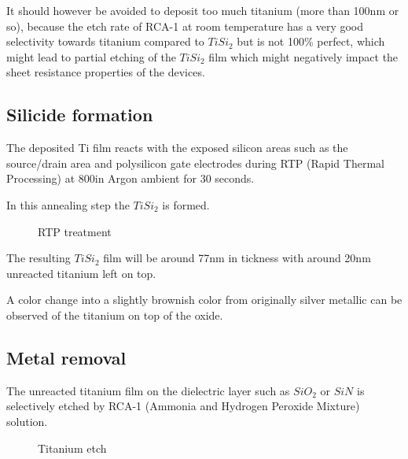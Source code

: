 It should however be avoided to deposit too much titanium (more than 100nm or so), because the etch rate of RCA-1 at room temperature
has a very good selectivity towards titanium compared to $Ti Si_2$ but is not 100\% perfect, which might lead to partial etching of
the $Ti Si_2$ film which might negatively impact the sheet resistance properties of the devices.

\subsection{Silicide formation}

The deposited Ti film reacts with the exposed silicon areas such as the source/drain area and polysilicon gate electrodes during RTP (Rapid Thermal Processing) at 800\degreesC in Argon ambient for 30 seconds.

In this annealing step the $Ti Si_2$ is formed.

\begin{figure}[H]
	\centering
	\begin{tikzpicture}[node distance = 3cm, auto, thick,scale=\CrossSectionOnly, every node/.style={transform shape}]
		
	\end{tikzpicture}
	\begin{tikzpicture}[node distance = 3cm, auto, thick,scale=\CrossSectionOnly, every node/.style={transform shape}]
		
	\end{tikzpicture}
	\caption{RTP treatment}
\end{figure}

The resulting $Ti Si_2$ film will be around 77nm in tickness with around 20nm unreacted titanium left on top.

A color change into a slightly brownish color from originally silver metallic can be observed of the titanium on top of the oxide.

\newpage

\subsection{Metal removal}

The unreacted titanium film on the dielectric layer such as $SiO_2$ or $SiN$ is selectively etched by RCA-1 (Ammonia and Hydrogen Peroxide Mixture) solution.

\begin{figure}[H]
	\centering
	\begin{tikzpicture}[node distance = 3cm, auto, thick,scale=\CrossSectionOnly, every node/.style={transform shape}]
		
	\end{tikzpicture}
	\begin{tikzpicture}[node distance = 3cm, auto, thick,scale=\CrossSectionOnly, every node/.style={transform shape}]
		
	\end{tikzpicture}
	\caption{Titanium etch}
\end{figure}

